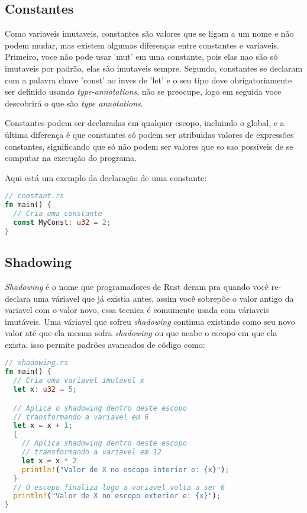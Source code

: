 \subsection{Constantes}

Como variaveis imutaveis, constantes são valores que se ligam a um nome e não podem mudar, mas existem algumas diferenças entre constantes e variaveis. Primeiro, voce não pode usar 'mut' em uma constante, pois elas nao são só imutaveis por padrão, elas são imutaveis sempre. Segundo, constantes se declaram com a palavra chave 'const' ao inves de 'let' e o seu tipo deve obrigatoriamente ser definido usando \textit{type-annotations}, não se preocupe, logo em seguida voce descobrirá o que são \textit{type annotations}.
\par
Constantes podem ser declaradas em qualquer escopo, incluindo o global, e a última diferença é que constantes só podem ser atribuidas valores de expressões constantes, significando que só não podem ser valores que so sao possíveis de se computar na execução do programa.
\par
Aqui está um exemplo da declaração de uma constante:

\begin{lstlisting}[language=rust]
// constant.rs
fn main() {
  // Cria uma constante
  const MyConst: u32 = 2; 
}
\end{lstlisting}

\subsection{Shadowing}

\textit{Shadowing} é o nome que programadores de Rust deram pra quando você re-declara uma váriavel que já existia antes, assim você sobrepõe o valor antigo da variavel com o valor novo, essa tecnica é comumente usada com váriaveis imutáveis. Uma váriavel que sofreu \textit{shadowing} continua existindo como seu novo valor até que ela mesma sofra \textit{shadowing} ou que acabe o escopo em que ela exista, isso permite padrões avancados de código como:

\begin{lstlisting}[language=rust]
// shadowing.rs
fn main() {
  // Cria uma variavel imutavel x
  let x: u32 = 5;

  // Aplica o shadowing dentro deste escopo
  // transformando a variavel em 6
  let x = x + 1;
  {
    // Aplica shadowing dentro deste escopo
    // transformando a variavel em 12
    let x = x * 2
    println!("Valor de X no escopo interior e: {x}");
  }
  // O escopo finaliza logo a variavel volta a ser 6
  println!("Valor de X no escopo exterior e: {x}");
}
\end{lstlisting}

